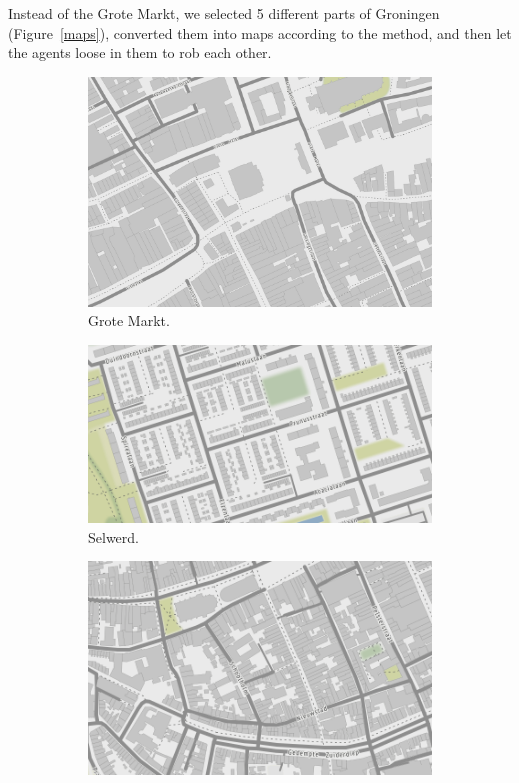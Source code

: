 Instead of the Grote Markt, we selected 5 different parts of Groningen (Figure~\ref{maps}), converted them into maps according to the method, and then let the agents loose in them to rob each other.
\begin{figure}[htbp]
\begin{center}
\begin{subfigure}{.5\textwidth}
\includegraphics[width=0.8\linewidth]{../experiments/GroteMarktMaps/maps/groteMarkt.png}
\caption{Grote Markt.}
\end{subfigure}%
\begin{subfigure}{.5\textwidth}
\includegraphics[width=0.8\linewidth]{../experiments/GroteMarktMaps/maps/Selwerd.png}
\caption{Selwerd.}
\end{subfigure}
\begin{subfigure}{.5\textwidth}
\includegraphics[width=0.8\linewidth]{../experiments/GroteMarktMaps/maps/zuidCentrum.png}

\end{subfigure}
\end{center}
\end{figure}
